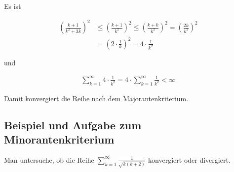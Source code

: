 \documentclass[fontsize=9pt,
               parskip=half-,
               DIV=14,
               listof=chapterentry,
               tocflat]{scrbook}
\begin{document}
\begin{solution*}[Majorantenkriterium]
Es ist

\begin{align*}
\left({\frac {k+1}{k^{2}+3k}}\right)^{2}&\leq \left({\frac {k+1}{k^{2}}}\right)^{2}\leq \left({\frac {k+k}{k^{2}}}\right)^{2}=\left({\frac {2k}{k^{2}}}\right)^{2}\\[0.5em]&=\left(2\cdot {\frac {1}{k}}\right)^{2}=4\cdot {\frac {1}{k^{2}}}
\end{align*}

und

\begin{align*}
\sum _{k=1}^{\infty }4\cdot {\frac {1}{k^{2}}}=4\cdot \sum _{k=1}^{\infty }{\frac {1}{k^{2}}}<\infty 
\end{align*}

Damit konvergiert die Reihe nach dem Majorantenkriterium.

\end{solution*}

\subsection{Beispiel und Aufgabe zum Minorantenkriterium}

\begin{exercise*}[Minorantenkriterium]
Man untersuche, ob die Reihe $\sum _{k=1}^{\infty }{\tfrac {1}{\sqrt {k(k+2)}}}$ konvergiert oder divergiert.

\end{exercise*}
\end{document}
